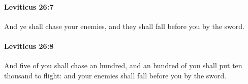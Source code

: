 		\paragraph{Leviticus 26:7} %
			\label{LEVITICUS-26-7}

			And ye shall chase your enemies, and they shall fall before you by the sword.


		\paragraph{Leviticus 26:8} %
			\label{LEVITICUS-26-8}

			And five of you shall chase an hundred, and an hundred of you shall put ten thousand to flight: and your enemies shall fall before you by the sword.


